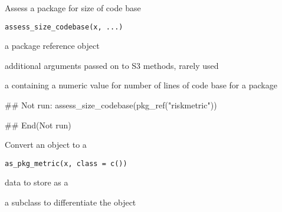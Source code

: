 \documentclass[a4paper]{book}
\begin{document}
%
\begin{Description}
Assess a package for size of code base
\end{Description}
%
\begin{Usage}
\begin{verbatim}
assess_size_codebase(x, ...)
\end{verbatim}
\end{Usage}
%
\begin{Arguments}
\begin{ldescription}
\item[\code{x}] a  package reference object

\item[\code{...}] additional arguments passed on to S3 methods, rarely used
\end{ldescription}
\end{Arguments}
%
\begin{Value}
a  containing a numeric value for number of lines of code base for a package
\end{Value}
%
\begin{SeeAlso}
\end{SeeAlso}
%
\begin{Examples}
\begin{ExampleCode}
## Not run: 
assess_size_codebase(pkg_ref("riskmetric"))

## End(Not run)
\end{ExampleCode}
\end{Examples}
%
\begin{Description}
Convert an object to a 
\end{Description}
%
\begin{Usage}
\begin{verbatim}
as_pkg_metric(x, class = c())
\end{verbatim}
\end{Usage}
%
\begin{Arguments}
\begin{ldescription}
\item[\code{x}] data to store as a 

\item[\code{class}] a subclass to differentiate the  object
\end{ldescription}
\end{Arguments}
\end{document}
